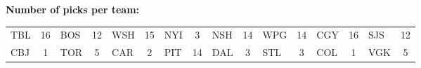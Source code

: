 \documentclass[10pt]{article}
\begin{document}
\begin{minipage}[t!]{15cm}
    \vspace{-4cm}
    {\bf Number of picks per team:}\\
    \begin{tabular}{lc | lc | lc | lc | lc | lc | lc | lc }
        TBL & 16 & BOS & 12 & WSH & 15 & NYI & 3 & NSH & 14 & WPG & 14 & CGY & 16 & SJS & 12 \\
        CBJ & 1 & TOR & 5 & CAR & 2 & PIT & 14 & DAL & 3 & STL & 3 & COL & 1 & VGK & 5 \\
    \end{tabular}
\end{minipage}
\end{document}
